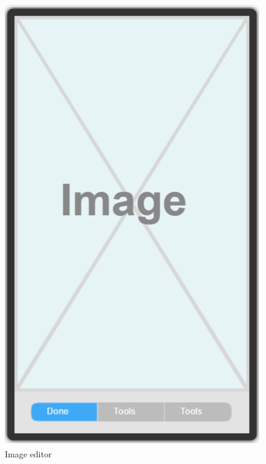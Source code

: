 \documentclass[10pt,a4paper]{article}
\begin{document}
\begin {description}
\begin{figure}
\begin{minipage}{0.35\textwidth}
		\includegraphics[width=\linewidth]{Prototype_img/p3.png}
		\caption{Image editor}
		\label{fig:p3}
	\end{minipage}
	\begin{minipage}{0.35\textwidth}

\end{minipage}
\end{figure}
\end{description}
\end{document}
